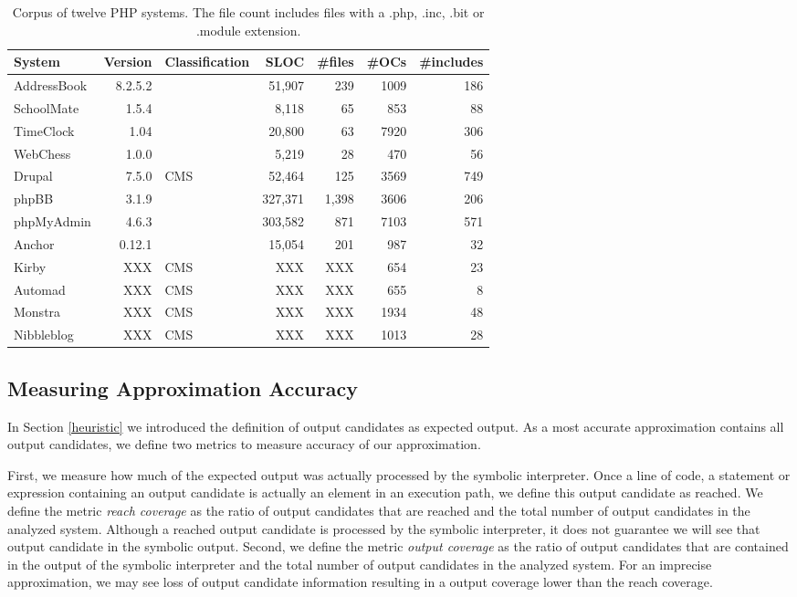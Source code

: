 \documentclass[sigconf]{acmart}
\begin{document}
\begin{table}[t]
\centering 
	\begin{tabular}{lrp{4cm}rrrr}
	\toprule
	\textbf{System} & \textbf{Version} & \textbf{Classification} & \textbf{SLOC} &
	\textbf{\#files} & \textbf{\#OCs} & \textbf{\#includes}
	\\
	\midrule
	AddressBook & 8.2.5.2 &  & 51,907 & 239  & 1009 & 186\\
	SchoolMate & 1.5.4 &  & 8,118 & 65  & 853 & 88\\
	TimeClock & 1.04 &  & 20,800 & 63  & 7920 & 306\\
	WebChess & 1.0.0 &  & 5,219 & 28  & 470 & 56\\
	\midrule
	Drupal & 7.5.0 & CMS & 52,464 & 125  & 3569 & 749\\
	phpBB & 3.1.9 &  & 327,371 & 1,398  & 3606 & 206\\
	phpMyAdmin & 4.6.3 &  & 303,582 & 871  & 7103 & 571\\
	\midrule
	Anchor & 0.12.1 &  & 15,054 & 201 & 987 & 32\\
	Kirby & XXX & CMS & XXX & XXX  & 654 & 23\\
	Automad & XXX & CMS & XXX & XXX  & 655 & 8\\
	Monstra & XXX & CMS & XXX & XXX  & 1934 & 48\\
	Nibbleblog & XXX & CMS & XXX & XXX  & 1013 & 28\\
	\bottomrule
	\end{tabular}
	\caption{Corpus of twelve PHP systems. The file count includes files with a .php,
	.inc, .bit or .module extension.}
	\label{corpus}
\end{table}


\subsection{Measuring Approximation Accuracy}
\label{HowAccurateIsOurApproximation} 
In Section \ref{heuristic} we introduced the definition of output candidates as
expected output. As a most accurate approximation contains all output
candidates, we define two metrics to measure accuracy of our approximation.

First, we measure how much of the expected output was actually processed by the
symbolic interpreter.  Once a line of code, a statement or expression
containing an output candidate is actually an element in an execution path, we
define this output candidate as reached. We define the metric \emph{reach
coverage} as the ratio of output candidates that are reached and the total
number of output candidates in the analyzed system. Although a reached output
candidate is processed by the symbolic interpreter, it does not guarantee we
will see that output candidate in the symbolic output. Second, we define the
metric \emph{output coverage} as the ratio of output candidates that are
contained in the output of the symbolic interpreter and the total number of
output candidates in the analyzed system.  For an imprecise approximation, we
may see loss of output candidate information resulting in a output coverage
lower than the reach coverage.
\end{document}
